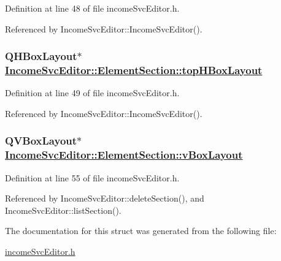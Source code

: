 Definition at line 48 of file income\-Svc\-Editor.h.

Referenced by Income\-Svc\-Editor::Income\-Svc\-Editor().\hypertarget{structIncomeSvcEditor_1_1ElementSection_o1}{
\subsubsection[topHBoxLayout]{\setlength{\rightskip}{0pt plus 5cm}QHBox\-Layout$\ast$ \hyperlink{structIncomeSvcEditor_1_1ElementSection_o1}{Income\-Svc\-Editor::Element\-Section::top\-HBox\-Layout}}}
\label{structIncomeSvcEditor_1_1ElementSection_o1}


Definition at line 49 of file income\-Svc\-Editor.h.

Referenced by Income\-Svc\-Editor::Income\-Svc\-Editor().\hypertarget{structIncomeSvcEditor_1_1ElementSection_o7}{
\subsubsection[vBoxLayout]{\setlength{\rightskip}{0pt plus 5cm}QVBox\-Layout$\ast$ \hyperlink{structIncomeSvcEditor_1_1ElementSection_o7}{Income\-Svc\-Editor::Element\-Section::v\-Box\-Layout}}}
\label{structIncomeSvcEditor_1_1ElementSection_o7}


Definition at line 55 of file income\-Svc\-Editor.h.

Referenced by Income\-Svc\-Editor::delete\-Section(), and Income\-Svc\-Editor::list\-Section().

The documentation for this struct was generated from the following file:\begin{CompactItemize}
\item 
\hyperlink{incomeSvcEditor_8h}{income\-Svc\-Editor.h}\end{CompactItemize}
